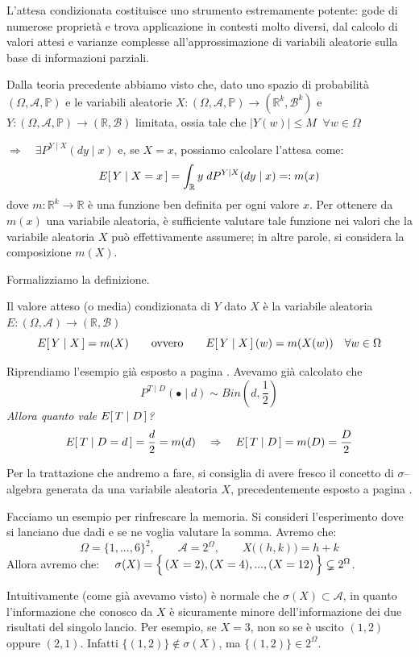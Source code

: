 \medskip
L’attesa condizionata costituisce uno strumento estremamente potente: gode di numerose proprietà e trova applicazione in contesti molto diversi, dal calcolo di valori attesi e varianze complesse all’approssimazione di variabili aleatorie sulla base di informazioni parziali.

\bigskip
\noindent Dalla teoria precedente abbiamo visto che, dato uno spazio di probabilità $(\Omega, \mathcal{A}, \mathbb{P})$ e le variabili aleatorie $X:(\Omega, \mathcal{A}, \mathbb{P})\to(\mathbb{R}^k, \mathcal{B}^k)$ e $Y:(\Omega, \mathcal{A}, \mathbb{P})\to(\mathbb{R}, \mathcal{B})$ limitata, ossia tale che $|Y(w)|\leq M\;\;\forall w\in \Omega$

\medskip

$\Rightarrow \quad \exists P^{Y\mid X}(dy\mid x)$ e, se $X=x$, possiamo calcolare l'attesa come:
\[E\!\left[\,Y\mid X=x\,\right] = \int_{\mathbb{R}}y\;dP^{Y\mid X}(dy\mid x)=:m(x)\]
dove \(m : \mathbb{R}^k \to \mathbb{R}\) è una funzione ben definita per ogni valore \(x\).  
Per ottenere da \(m(x)\) una variabile aleatoria, è sufficiente valutare tale funzione nei valori che la variabile aleatoria $X$ può effettivamente assumere; in altre parole, si considera la composizione $m(X)$.

\bigskip 
\noindent Formalizziamo la definizione.

\begin{definizione}
\label{def:E_cond}
    Il valore atteso (o media) condizionata di $Y$ dato $X$ è la variabile aleatoria $E:(\Omega, \mathcal{A})\to (\mathbb{R}, \mathcal{B})$
    \[E\!\left[\,Y\mid X\,\right] = m(X)\qquad \text{ovvero}\qquad E\!\left[\,Y\mid X\,\right](w) = m(X(w))\quad \forall w\in\Omega\]
\end{definizione}

\begin{esempio}
\label{es:continuo}
    Riprendiamo l'esempio già esposto a pagina \pageref{es:leggi_cond}. Avevamo già calcolato che 
    \[P^{T\mid D}(\bullet\mid d) \sim Bin\left(d, \frac{1}{2}\right)\]
    \textit{Allora quanto vale $E\!\left[\,T\mid D\,\right]$?}
    \[E\!\left[\,T\mid D=d\,\right] = \frac{d}{2} = m(d)\quad \Rightarrow\quad E\!\left[\,T\mid D\,\right] = m(D) = \frac{D}{2}\]
\end{esempio}

\bigskip
\noindent Per la trattazione che andremo a fare, si consiglia di avere fresco il concetto di $\sigma$--algebra generata da una variabile aleatoria $X$, precedentemente esposto a pagina \pageref{sigma(X)}.
\begin{esempio}
    Facciamo un esempio per rinfrescare la memoria. Si consideri l'esperimento dove si lanciano due dadi e se ne voglia valutare la somma. Avremo che:
    \[\Omega= \{1, ..., 6\}^2, \qquad \mathcal{A} = 2^\Omega, \qquad X\bigl((h, k)\bigr) = h+k\]
    Allora avremo che: $\quad \sigma(X) = \Bigl\{\,(X=2), (X=4), ..., (X=12)\,\Bigr\}\subsetneq 2^\Omega$.

    \medskip
    Intuitivamente (come già avevamo visto) è normale che $\sigma(X)\subset\mathcal{A}$, in quanto l'informazione che conosco da $X$ è sicuramente minore dell'informazione dei due risultati del singolo lancio. Per esempio, se $X=3$, non so se è uscito $(1, 2)$ oppure $(2, 1)$. Infatti $\{(1, 2)\}\notin \sigma(X)$, ma $\{(1, 2)\}\in 2^\Omega$.
\end{esempio}


